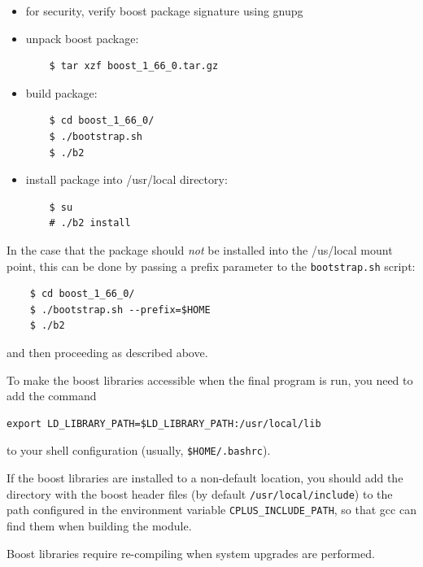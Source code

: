 \documentclass[11pt,a4paper]{scrartcl}
\begin{document}
\begin{itemize}
\item for security, verify boost package signature using gnupg

\item unpack boost package:
  
  \begin{verbatim}
    $ tar xzf boost_1_66_0.tar.gz
  \end{verbatim}    

\item build package:

  \begin{verbatim}
    $ cd boost_1_66_0/
    $ ./bootstrap.sh
    $ ./b2
  \end{verbatim}


\item install package into /usr/local directory:

  \begin{verbatim}
    $ su
    # ./b2 install
  \end{verbatim}    
\end{itemize}

In the case that the package  should \emph{not} be installed
into the /us/local mount point, this can be done by passing
a prefix parameter to the \texttt{bootstrap.sh} script:

  \begin{verbatim}
    $ cd boost_1_66_0/
    $ ./bootstrap.sh --prefix=$HOME
    $ ./b2
  \end{verbatim}

  and then proceeding as described above.


To make the boost libraries accessible when the
final program is run, you need to add the
command

\begin{verbatim}
export LD_LIBRARY_PATH=$LD_LIBRARY_PATH:/usr/local/lib
\end{verbatim}

to your shell configuration (usually, \verb+$HOME/.bashrc+).

If the boost libraries are installed to a non-default location, you
should add the directory with the boost header files (by default
\verb+/usr/local/include+) to the path configured in the environment
variable \verb+CPLUS_INCLUDE_PATH+, so that gcc can find them when
building the module.

Boost libraries require re-compiling when system upgrades are
performed.
\end{document}
